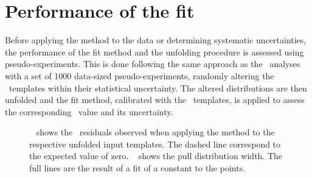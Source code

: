 \section{Performance of the fit}
\label{sect:unfoldsyst}
%
Before applying the method to the data or determining systematic uncertainties, the performance of the fit method and the unfolding procedure is assessed using pseudo-experiments. This is done following the same approach as the \recolevel\ analyses with a set of 1000 data-sized pseudo-experiments, randomly altering the \recolevel\ templates within their statistical uncertainty. The altered distributions are then unfolded and the fit method, calibrated with the \truelevel\ templates, is applied to assess the corresponding \mt\ value and its uncertainty.
%
\begin{figure}[tbp!]
\centering
{}
\caption[\mt\ residuals and pull widths for the unfolded $\sqrts=8$~\TeV\ data]{
%
\Fig~ shows the \mt\ residuals observed when applying the method to the respective unfolded input templates.
%
The dashed line correspond to the expected value of zero. 
%
\Fig~ shows the pull distribution width.
%
The full lines are the result of a fit of a constant to the points. 
%
\label{fig:pullsunfolding}
}
\end{figure}
